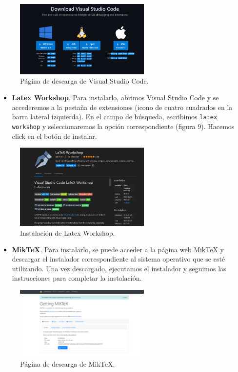 \documentclass[a4paper]{article}
\begin{document}
\begin{figure}[h!]
    \centering
    \includegraphics[width=0.6\textwidth]{../img/vsc.png}
    \caption{Página de descarga de Visual Studio Code.}
\end{figure}

\begin{itemize}
    \item \textbf{Latex Workshop}. Para instalarlo, abrimos Visual Studio Code y se accederemos a la pestaña de extensiones (icono de cuatro cuadrados en la barra lateral izquierda). En el campo de búsqueda, escribimos \texttt{latex workshop} y seleccionaremos la opción correspondiente (figura 9). Hacemos click en el botón de instalar.
\end{itemize}

\begin{figure}[h!]
    \centering
    \includegraphics[width=0.6\textwidth]{../img/extensions.png}
    \caption{Instalación de Latex Workshop.}
\end{figure}

\begin{itemize}
    \item \textbf{MikTeX}. Para instalarlo, se puede acceder a la página web \href{https://miktex.org/download}{MikTeX} y descargar el instalador correspondiente al sistema operativo que se esté utilizando. Una vez descargado, ejecutamos el instalador y seguimos las instrucciones para completar la instalación.
\end{itemize}
    
\begin{figure}[h!]
    \centering
    \includegraphics[width=0.6\textwidth]{../img/miktex.png}
    \caption{Página de descarga de MikTeX.}
\end{figure}
    
\end{document}
